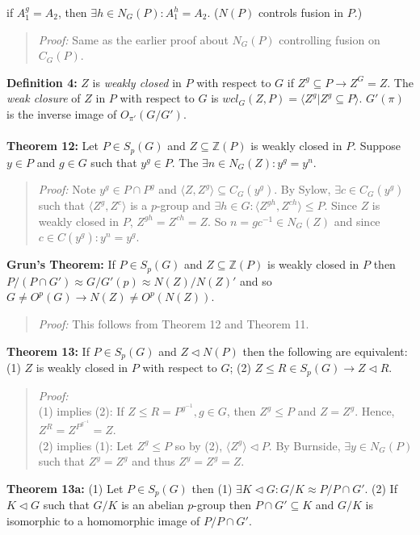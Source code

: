 if $A_1^g=A_2$, then $\exists h \in N_G(P): A_1^h=A_2$. ($N(P)$ controls fusion in $P$.)
\begin{quote}
\emph{Proof:}  
Same as the earlier proof about $N_G(P)$ controlling fusion on $C_G(P)$.
\end{quote}
{\bf Definition 4:}
$Z$ is \emph {weakly closed} in $P$ with respect to $G$ if $Z^g \subseteq P \rightarrow Z^G=Z$.
The \emph {weak closure} of $Z$ in $P$ with respect to $G$ is 
$wcl_G(Z, P)= \langle Z^g| Z^g \subseteq P \rangle$.  $G'(\pi)$ is the inverse image of
$O_{\pi'}(G/G')$.
\\
\\
{\bf Theorem 12:}
Let $P \in S_p(G)$ and $Z \subseteq {\mathbb Z}(P)$ 
is weakly closed in $P$.  Suppose $y \in P$ and $g \in G$ such that
$y^g \in P$.  The $\exists n \in N_G(Z): y^g=y^n$.
\begin{quote}
\emph{Proof:}  
Note $y^g \in P \cap P^g$ and $ \langle Z, Z^g \rangle \subseteq C_G(y^g )$.  By Sylow,
$\exists c \in C_G(y^g )$ such that 
$ \langle Z^g, Z^c \rangle $ is a $p$-group and $\exists h \in G:
\langle Z^{gh}, Z^{ch} \rangle \le P$.  Since $Z$ is weakly closed in $P$, 
$Z^{gh}= Z^{ch}= Z$. So
$n= g c^{-1} \in N_G(Z)$ and since $c \in C(y^g): y^n= y^g$.
\end{quote}
{\bf Grun's Theorem:} If $P \in S_p(G)$ and $Z \subseteq {\mathbb Z}(P)$ 
is weakly closed in $P$ then
$P/(P \cap G') \approx G/G' (p) \approx N(Z)/N(Z)'$ and so 
$G \ne O^p(G) \rightarrow N(Z) \ne O^p(N(Z))$.
\begin{quote}
\emph{Proof:}  
This follows from Theorem 12 and Theorem 11.
\end{quote}
{\bf Theorem 13:} If
$P \in S_p(G)$ and $Z \lhd N(P)$ then the following are equivalent:
(1) $Z$ is weakly closed in $P$ with respect to $G$;
(2) $Z \le R \in S_p(G) \rightarrow Z \lhd R$.
\begin{quote}
\emph{Proof:} 
\\
(1) implies (2): If $Z \le R = P^{g^{-1}}, g \in G$, then $Z^g \le P$ and $Z=Z^g$.
Hence, $Z^R= Z^{P^{g^{-1}}} = Z$.\\
(2) implies (1):  Let $Z^g \le P$ so by (2), $ \langle Z^g \rangle \lhd P$.  
By Burnside, $\exists y \in N_G(P)$
such that  $Z^y=Z^g$ and thus $Z^y=Z^g=Z$.
\end{quote}
{\bf Theorem 13a:}  (1) Let $P \in S_p(G)$ then (1) $\exists K \lhd G: G/K \approx P/ P \cap G'$.
(2) If $K \lhd G$ such that $G/K$ is an abelian $p$-group then $P \cap G' \subseteq K$ 
and $G/K$ is isomorphic to a homomorphic image of $P/P \cap G'$.
